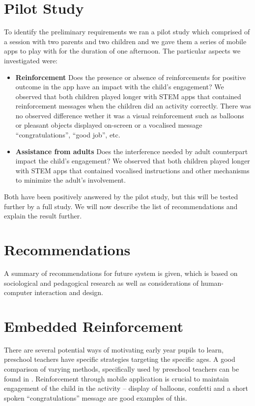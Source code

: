 \documentclass{sig-alternate}
\begin{document}
\section{Pilot Study}
To identify the preliminary requirements we ran a pilot study which comprised of a session with two parents and two children and we gave them a series of mobile apps to play with for the duration of one afternoon. The particular aspects we investigated were:
\begin{itemize}
\item \textbf{Reinforcement} Does the presence or absence of reinforcements for positive outcome in the app have an impact with the child's engagement? We observed that both children played longer with STEM apps that contained reinforcement messages when the children did an activity correctly. There was no observed difference wether it was a visual reinforcement such as balloons or pleasant objects displayed on-screen or a vocalised message ``congratulations'', ``good job'', etc.
\item \textbf{Assistance from adults} Does the interference needed by adult counterpart impact the child's engagement? We observed that both children played longer with STEM apps that contained vocalised instructions and other mechanisms to minimize the adult's involvement. 
\end{itemize}
Both have been positively answered by the pilot study, but this will be tested further by a full study. 
We will now describe the list of recommendations and explain the result further.


\section{Recommendations}
A summary of recommendations for future system is given, which is based on sociological and pedagogical research as well as considerations of human-computer interaction and design. 

\section*{Embedded Reinforcement}
There are several potential ways of motivating early year pupils to learn, preschool teachers have specific strategies targeting the specific ages. A good comparison of varying methods, specifically used by preschool teachers can be found in \cite{hanley2009influencing}. Reinforcement through mobile application is crucial to maintain engagement of the child in the activity -- display of balloons, confetti and a short spoken ``congratulations'' message are good examples of this.
\end{document}
